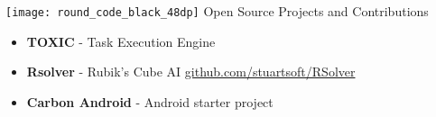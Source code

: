 {\noindent \texttt{[image: round\_code\_black\_48dp]} \hspace{0.25pc} \large Open Source Projects and Contributions}\hspace{1pc}{\noindent\rule{25pc}{0.4pt}}

\begin{itemize}
	\setlength{\itemsep}{0.0pc}
	\item[] \textbf{TOXIC} - Task Execution Engine
	
	\item[] \textbf{Rsolver} - Rubik's Cube AI \hspace{22.5pc} {\secondaryColor \href{https://www.github.com/stuartsoft/RSolver}{github.com/stuartsoft/RSolver}}
	
	\item[] \textbf{Carbon Android} - Android starter project\hspace{13.15pc}
	{}	
\end{itemize}

